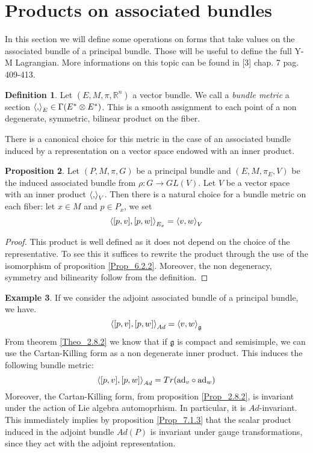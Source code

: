 \documentclass[12pt,a4paper]{report}
\theoremstyle{definition}
\newtheorem{Def}{Definition}[chapter]
\theoremstyle{Theorem}
\newtheorem{Prop}[Def]{Proposition}
\theoremstyle{definition}
\newtheorem{Ex}[Def]{Example}
\theoremstyle{definition}
\begin{document}
	\section{Products on associated bundles}
	In this section we will define some operations on forms that take values on the associated bundle of a principal bundle. Those will be useful to define the full Y-M Lagrangian. More informations on this topic can be found in [3] chap. 7 pag. 409-413.
	\begin{Def}
		Let $(E,M,\pi,\mathbb{R}^n)$ a vector bundle. We call a \textit{bundle metric} a section $\braket{,}_E\in \Gamma(E^*\otimes E^*)$. This is a smooth assignment to each point of a non degenerate, symmetric, bilinear product on the fiber.
	\end{Def}
	There is a canonical choice for this metric in the case of an associated bundle induced by a representation on a vector space endowed with an inner product.
	\begin{Prop}\label{Prop_7.3.1}
		Let $(P,M,\pi,G)$ be a principal bundle and $(E,M,\pi_E,V)$ be the induced associated bundle from $\rho:G\rightarrow GL(V)$. Let $V$ be a vector space with an inner product $\braket{,}_V$. Then there is a natural choice for a bundle metric on each fiber: let $x\in M$ and $p\in P_x$, we set 
		$$\braket{[p,v],[p,w]}_{E_x}=\braket{v,w}_V$$
	\end{Prop}
	\begin{proof}
		This product is well defined as it does not depend on the choice of the representative. To see this it suffices to rewrite the product through the use of the isomorphism of proposition \ref{Prop_6.2.2}. Moreover, the non degeneracy, symmetry and bilinearity follow from the definition.
	\end{proof}
	\begin{Ex}
		If we consider the adjoint associated bundle of a principal bundle, we have.
		$$\braket{[p,v],[p,w]}_{Ad}=\braket{v,w}_\mathfrak{g}$$
		From theorem \ref{Theo_2.8.2} we know that if $\mathfrak{g}$ is compact and semisimple, we can use the Cartan-Killing form as a non degenerate inner product. This induces the following bundle metric:
		$$\braket{[p,v],[p,w]}_{Ad}=Tr(\hbox{ad}_v\circ\hbox{ad}_w)$$
		Moreover, the Cartan-Killing form, from proposition \ref{Prop_2.8.2}, is invariant under the action of Lie algebra automoprhism. In particular, it is $Ad$-invariant. This immediately implies by proposition \ref{Prop_7.1.3} that the scalar product induced in the adjoint bundle $Ad(P)$ is invariant under gauge transformations, since they act with the adjoint representation.
	\end{Ex}
\end{document}

